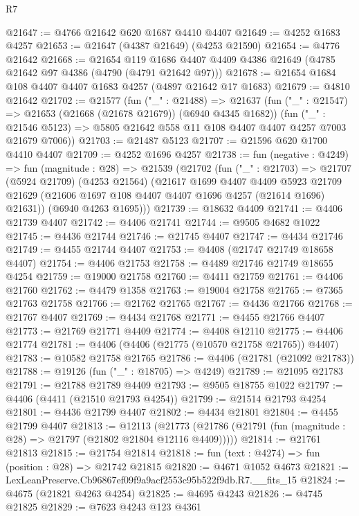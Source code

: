 \begin{lexlean}{R7}
\begin{coremodule}
@21647 := @4766 @21642 @620 @1687 @4410 @4407
@21649 := @4252 @1683 @4257
@21653 := @21647 (@4387 @21649) (@4253 @21590)
@21654 := @4776 @21642
@21668 := @21654
    @119
    @1686
    @4407
    @4409
    @4386
    @21649
    (@4785 @21642 @97 @4386 (@4790 (@4791 @21642 @97)))
@21678 := @21654 @1684 @108 @4407 @4407 @1683 @4257 (@4897 @21642 @17 @1683)
@21679 := @4810 @21642
@21702 := @21577
    (fun ("_" : @21488) =>
    @21637
      (fun ("_" : @21547) => @21653 (@21668 (@21678 @21679)) (@6940 @4345 @1682))
      (fun ("_" : @21546 @5123) => @5805 @21642 @558 @11 @108 @4407 @4407 @4257 @7003 @21679 @7006))
@21703 := @21487 @5123
@21707 := @21596 @620 @1700 @4410 @4407
@21709 := @4252 @1696 @4257
@21738 := fun (negative : @4249) =>
  fun (magnitude : @28) =>
  @21539
    (@21702
      (fun ("_" : @21703) =>
      @21707
        (@5924 @21709)
        (@4253 @21564)
        (@21617
          @1699
          @4407
          @4409
          @5923
          @21709
          @21629
          (@21606 @1697 @108 @4407 @4407 @1696 @4257 (@21614 @1696) @21631))
        (@6940 @4263 @1695)))
@21739 := @18632 @4409
@21741 := @4406 @21739 @4407
@21742 := @4406 @21741
@21744 := @9505 @4682 @1022
@21745 := @4436 @21744
@21746 := @21745 @4407
@21747 := @4434 @21746
@21749 := @4455 @21744 @4407
@21753 := @4408 (@21747 @21749 @18658 @4407)
@21754 := @4406 @21753
@21758 := @4489 @21746 @21749 @18655 @4254
@21759 := @19000 @21758
@21760 := @4411 @21759
@21761 := @4406 @21760
@21762 := @4479 @1358
@21763 := @19004 @21758
@21765 := @7365 @21763 @21758
@21766 := @21762 @21765
@21767 := @4436 @21766
@21768 := @21767 @4407
@21769 := @4434 @21768
@21771 := @4455 @21766 @4407
@21773 := @21769 @21771 @4409
@21774 := @4408 @12110
@21775 := @4406 @21774
@21781 := @4406 (@4406 (@21775 (@10570 @21758 @21765)) @4407)
@21783 := @10582 @21758 @21765
@21786 := @4406 (@21781 (@21092 @21783))
@21788 := @19126 (fun ("_" : @18705) => @4249)
@21789 := @21095 @21783
@21791 := @21788 @21789 @4409
@21793 := @9505 @18755 @1022
@21797 := @4406 (@4411 (@21510 @21793 @4254))
@21799 := @21514 @21793 @4254
@21801 := @4436 @21799 @4407
@21802 := @4434 @21801
@21804 := @4455 @21799 @4407
@21813 := @12113
    (@21773 (@21786 (@21791 (fun (magnitude : @28) => @21797 (@21802 @21804 @12116 @4409)))))
@21814 := @21761 @21813
@21815 := @21754 @21814
@21818 := fun (text : @4274) => fun (position : @28) => @21742 @21815
@21820 := @4671 @1052 @4673
@21821 := LexLeanPreserve.Cb96867ef09f9a9acf2553c95b522f9db.R7.__fits_15
@21824 := @4675 (@21821 @4263 @4254)
@21825 := @4695 @4243
@21826 := @4745 @21825
@21829 := @7623 @4243 @123 @4361

\end{coremodule}
\end{lexlean}
